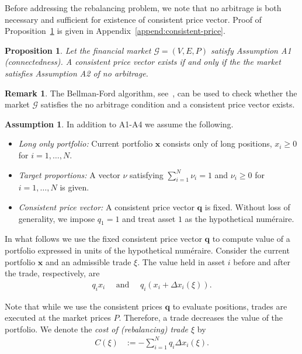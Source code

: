 \documentclass{article}
\newtheorem{proposition}[theorem]{Proposition}
\theoremstyle{definition}
\newtheorem{remark}[theorem]{Remark}
\newtheorem{assumption}[theorem]{Assumption}
\def\bx{\mathbf{x}}
\def\bq{\mathbf{q}}
\begin{document}
Before addressing the rebalancing problem, we note that no arbitrage is both necessary and sufficient for existence of consistent price vector. Proof of Proposition~\ref{prop:consistent-price} is given in Appendix~\ref{append:consistent-price}.
\begin{proposition}\label{prop:consistent-price}
    Let the financial market $\mathcal{G} = (V, E, P)$ satisfy Assumption A1 (connectedness). A consistent price vector exists if and only if the the market satisfies Assumption A2 of no arbitrage.
\end{proposition}

\begin{remark}
    The Bellman-Ford algorithm, see~\cite[Section 24.1]{CormenETAL09}, can be used to check whether the market $\mathcal{G}$ satisfies the no arbitrage condition and a consistent price vector exists.
\end{remark}

\begin{assumption}
In addition to A1-A4 we assume the following.
\begin{itemize}
    \item[A5] \textit{Long only portfolio:} Current portfolio $\bx$ consists only of long positions, $x_i \geq 0$ for $i=1, \dots, N$.
    \item[A6] \textit{Target proportions:} A vector $\nu$ satisfying $\sum_{i=1}^N \nu_i = 1$ and $\nu_i \geq 0$ for $i=1, \dots, N$ is given.
    \item[A7] \textit{Consistent price vector:} A consistent price vector $\bq$ is fixed. Without loss of generality, we impose $q_1 =1$ and treat asset $1$ as the hypothetical num\'eraire.
\end{itemize}
\end{assumption}




In what follows we use the fixed consistent price vector $\bq$ to compute value of  a portfolio expressed in units of the hypothetical num\'eraire. 
Consider the current portfolio $\bx$ and an admissible trade $\xi$. The value held in asset $i$ before and after the trade, respectively,  are
\begin{align*}
    q_i x_i \quad \text{ and }  \quad q_i \left( x_i +   \Delta x_i (\xi) \right). 
\end{align*}

Note that while we use the consistent prices $\bq$ to evaluate positions, trades are executed at the market prices $P$. Therefore, a trade 
decreases the value of the portfolio.  
We denote the \emph{cost of (rebalancing) trade $\xi$} by 
\begin{align*}
    C(\xi) &:=  - \sum_{i=1}^N q_i \Delta x_i(\xi).
\end{align*}
\end{document}
